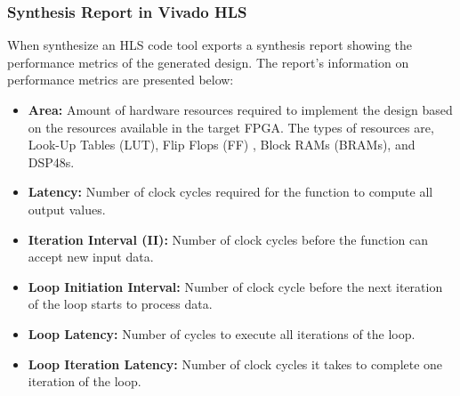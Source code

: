 \subsubsection{Synthesis Report in Vivado HLS}

When synthesize an HLS code tool exports a synthesis report showing the performance metrics of the generated design. The report's information on performance metrics are presented below:
\begin{itemize}
  \item \textbf{Area:} Amount of hardware resources required to implement the design based on the resources available in the target FPGA. The types of resources are, Look-Up Tables (LUT), Flip Flops (FF) , Block RAMs (BRAMs), and DSP48s.
  \item \textbf{Latency:} Number of clock cycles required for the function to compute all output values.
  \item \textbf{Iteration Interval (II):} Number of clock cycles before the function can accept new input data.
  \item \textbf{Loop Initiation Interval:} Number of clock cycle before the next iteration of the loop starts to process data.
   \item \textbf{Loop Latency:} Number of cycles to execute all iterations of the loop.
  \item \textbf{Loop Iteration Latency:} Number of clock cycles it takes to complete one iteration of the loop.
\end{itemize}


